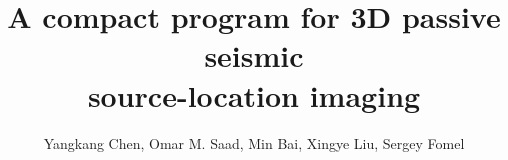 \DeclareRobustCommand{\dlo}[1]{}
\DeclareRobustCommand{\wen}[1]{#1}

\title{A compact program for 3D passive seismic \\
source-location imaging}

\author{Yangkang Chen\footnotemark[1], Omar M. Saad\footnotemark[1]\footnotemark[2], Min Bai\footnotemark[3],  Xingye Liu\footnotemark[4], Sergey Fomel\footnotemark[5] }

\renewcommand{\thefootnote}{\fnsymbol{footnote}}



\address{
\footnotemark[1]
School of Earth Sciences\\
Zhejiang University\\
Hangzhou, Zhejiang Province, China, 310027\\
chenyk2016@gmail.com\\
\footnotemark[2]
ENSN Lab \\
Seismology Department \\
National Research Institute of Astronomy and Geophysics (NRIAG)\\
Helwan 11731, Egypt\\
engomar91@ gmail.com\\
\footnotemark[3] Key Laboratory of Exploration Technology for Oil and Gas Resources of Ministry of Education\\
Yangtze University\\
Daxue Road No.111\\
Caidian District\\
Wuhan, China, 430100 \\
\footnotemark[4]
College of Geology and Environment\\
Xi’an University of Science and Technology\\
Xi’an, Shaanxi Province, China, 710054 \\
lwxwyh506673@126.com\\
\footnotemark[5]Bureau of Economic Geology \\
John A. and Katherine G. Jackson School of Geosciences \\
The University of Texas at Austin \\
University Station, Box X \\
Austin, TX 78713-8924 \\
sergey.fomel@beg.utexas.edu\\
Corresponding Author: Yangkang Chen (chenyk2016@gmail.com) 
}

